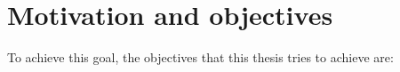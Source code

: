 \section{Motivation and objectives} %
\label{sec:intro:motivation}




To achieve this goal, the objectives that this thesis tries to achieve are:

